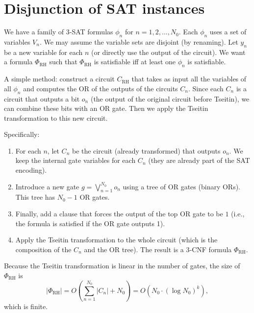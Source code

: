 \documentclass[11pt,a4paper]{article}
\begin{document}
\section{Disjunction of SAT instances}

We have a family of 3‑SAT formulas \(\phi_n\) for \(n=1,2,\dots,N_0\). Each \(\phi_n\) uses a set of variables \(V_n\). We may assume the variable sets are disjoint (by renaming). Let \(y_n\) be a new variable for each \(n\) (or directly use the output of the circuit). We want a formula \(\Phi_{\text{RH}}\) such that \(\Phi_{\text{RH}}\) is satisfiable iff at least one \(\phi_n\) is satisfiable.

A simple method: construct a circuit \(C_{\text{RH}}\) that takes as input all the variables of all \(\phi_n\) and computes the OR of the outputs of the circuits \(C_n\). Since each \(C_n\) is a circuit that outputs a bit \(o_n\) (the output of the original circuit before Tseitin), we can combine these bits with an OR gate. Then we apply the Tseitin transformation to this new circuit.

Specifically:
\begin{enumerate}
\item For each \(n\), let \(C_n\) be the circuit (already transformed) that outputs \(o_n\). We keep the internal gate variables for each \(C_n\) (they are already part of the SAT encoding).
\item Introduce a new gate \(g = \bigvee_{n=1}^{N_0} o_n\) using a tree of OR gates (binary ORs). This tree has \(N_0-1\) OR gates.
\item Finally, add a clause that forces the output of the top OR gate to be \(1\) (i.e., the formula is satisfied if the OR gate outputs 1).
\item Apply the Tseitin transformation to the whole circuit (which is the composition of the \(C_n\) and the OR tree). The result is a 3‑CNF formula \(\Phi_{\text{RH}}\).
\end{enumerate}

Because the Tseitin transformation is linear in the number of gates, the size of \(\Phi_{\text{RH}}\) is
\[
|\Phi_{\text{RH}}| = O\left( \sum_{n=1}^{N_0} |C_n| + N_0 \right) = O\left( N_0 \cdot (\log N_0)^k \right),
\]
which is finite.
\end{document}
